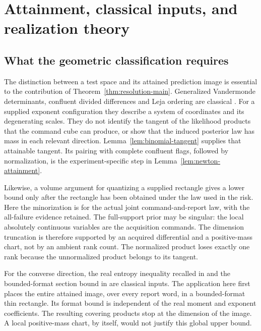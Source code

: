 \section{Attainment, classical inputs, and realization theory}
\label{sec:v33-comparison}



\subsection{What the geometric classification requires}
The distinction between a test space and its attained prediction image
is essential to the contribution of Theorem~\ref{thm:resolution-main}.
Generalized Vandermonde determinants, confluent divided differences and
Leja ordering are classical \cite{Pinkus,deBoor,Leja,BosEtAl}. For a
supplied exponent configuration they describe a system of coordinates
and its degenerating scales. They do not identify the tangent of the
likelihood products that the command cube can produce, or show that
the induced posterior law has mass in each relevant direction.
Lemma~\ref{lem:binomial-tangent} supplies that attainable tangent.
Its pairing with complete confluent flags, followed by normalization,
is the experiment-specific step in Lemma~\ref{lem:newton-attainment}.

Likewise, a volume argument for quantizing a supplied rectangle gives
a lower bound only after the rectangle has been obtained under the
law used in the risk. Here the minorization is for the actual joint
command-and-report law, with the all-failure evidence retained.
The full-support prior may be singular: the local absolutely continuous
variables are the acquisition commands. The dimension truncation is
therefore supported by an acquired differential and a positive-mass
chart, not by an ambient rank count. The normalized product loses
exactly one rank because the unnormalized product belongs to its tangent.

For the converse direction, the real entropy inequality recalled in
\cite{YomdinComte,ComteHalupczok} and the bounded-format section bound
in \cite[Lemma 2.18]{ZhangKileel} are classical inputs. The application
here first places the entire attained image, over every report word,
in a bounded-format thin rectangle. Its format bound is independent
of the real moment and exponent coefficients. The resulting covering
products stop at the dimension of the image. A local positive-mass
chart, by itself, would not justify this global upper bound.

